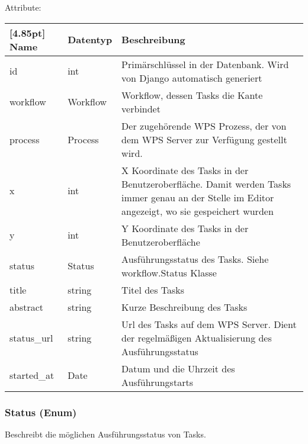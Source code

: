 			Attribute:
			\begin{center}
				\setlength\tabcolsep{5pt}
				\renewcommand{\arraystretch}{1.5}
				
				\begin{tabularx}{\textwidth}{|l|l|X|}
					\hline
					\rowcolor[gray]{0.75}[4.85pt]
					Name & Datentyp & Beschreibung \\ \hline 
			   		id & int & Primärschlüssel in der Datenbank. Wird von Django automatisch generiert \\ \hline
			   		workflow & Workflow & Workflow, dessen Tasks die Kante verbindet \\ \hline
			   		process & Process & Der zugehörende WPS Prozess, der von dem WPS Server zur Verfügung gestellt wird. \\\hline
			   		x & int & X Koordinate des Tasks in der Benutzeroberfläche. Damit werden Tasks immer genau an der Stelle im Editor angezeigt, wo sie gespeichert wurden\\ \hline
			   		y & int & Y Koordinate des Tasks in der Benutzeroberfläche\\ \hline
			   		status & Status & Ausführungsstatus des Tasks. Siehe workflow.Status Klasse \\ \hline
			   		title & string & Titel des Tasks \\ \hline
			   		abstract & string & Kurze Beschreibung des Tasks \\ \hline
			   		status\_url & string & Url des Tasks auf dem WPS Server. Dient der  regelmäßigen Aktualisierung des Ausführungsstatus \\ \hline
			   		started\_at & Date & Datum und die Uhrzeit des Ausführungstarts \\ \hline
				\end{tabularx}
			\end{center}			

\newpage

		\subsubsection{Status (Enum)}	
			Beschreibt die möglichen Ausführungsstatus von Tasks. \newline
			
